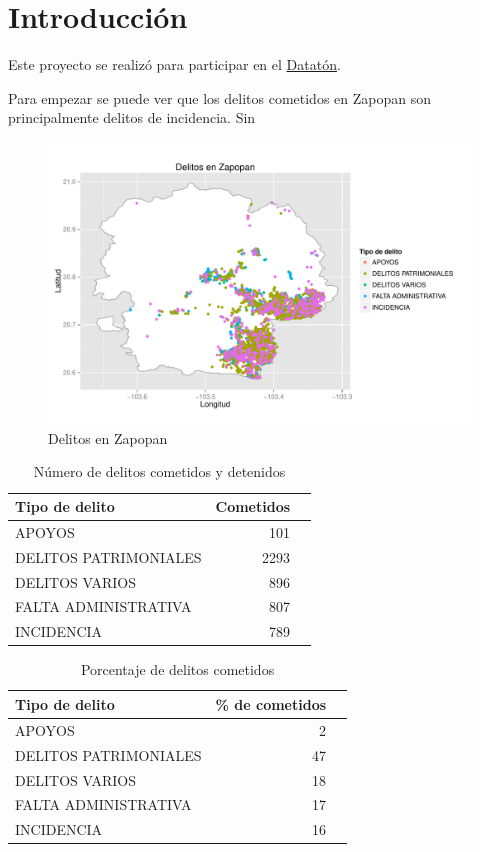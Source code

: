 \newpage
\chapter{Introducción}


\noindent  Este proyecto se realizó para participar en el \href{http://http://dataton.datos.gob.mx}{Datatón}.

Para empezar se puede ver que los delitos cometidos en Zapopan son principalmente delitos de incidencia. Sin 


\begin{figure}[H]
\centering
\caption{Delitos en Zapopan}
\includegraphics[width=120mm]{../../graphs/zapopan_delitos.pdf}
\end{figure}


\begin{table}[H]
\centering
\caption{Número de delitos cometidos y detenidos} 
\begin{tabular}{lrr}
  \hline
Tipo de delito & Cometidos  \\ 
  \hline
APOYOS & 101  \\ 
  DELITOS PATRIMONIALES & 2293 \\ 
  DELITOS VARIOS & 896 \\ 
  FALTA ADMINISTRATIVA & 807 \\ 
  INCIDENCIA & 789\\ 
   \hline
\end{tabular}
\end{table}

\begin{table}[H]
\centering
\caption{Porcentaje de delitos cometidos} 
\begin{tabular}{lrr}
  \hline
Tipo de delito & \% de cometidos  \\ 
  \hline
APOYOS & 2 \\ 
  DELITOS PATRIMONIALES & 47 \\ 
  DELITOS VARIOS & 18  \\ 
  FALTA ADMINISTRATIVA & 17  \\ 
  INCIDENCIA & 16  \\ 
   \hline
\end{tabular}
\end{table}

